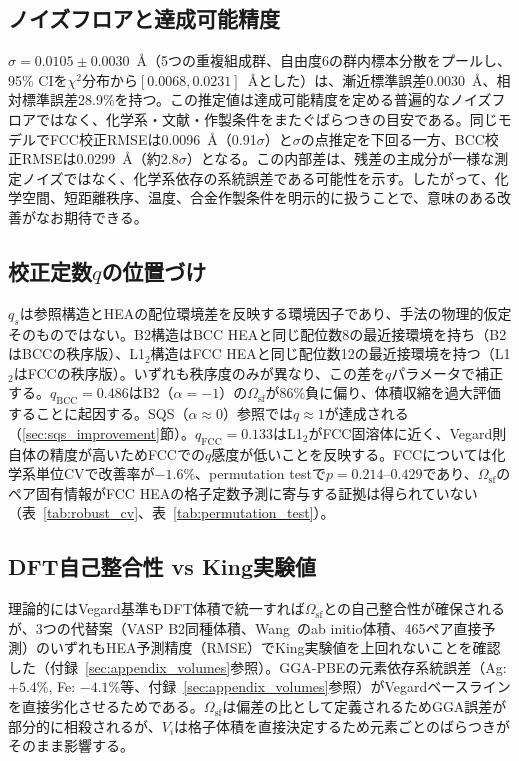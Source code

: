 \documentclass[5p,10pt]{elsarticle}
\begin{document}
\subsection{ノイズフロアと達成可能精度}

$\sigma = 0.0105 \pm 0.0030$~\AA{}（5つの重複組成群、自由度6の群内標本分散をプールし、95\% CIを$\chi^2$分布から$[0.0068, 0.0231]$~\AA{}とした）は、漸近標準誤差0.0030~\AA{}、相対標準誤差28.9\%を持つ。この推定値は達成可能精度を定める普遍的なノイズフロアではなく、化学系・文献・作製条件をまたぐばらつきの目安である。同じモデルでFCC校正RMSEは0.0096~\AA{}（0.91$\sigma$）と$\sigma$の点推定を下回る一方、BCC校正RMSEは0.0299~\AA{}（約$2.8\sigma$）となる。この内部差は、残差の主成分が一様な測定ノイズではなく、化学系依存の系統誤差である可能性を示す。したがって、化学空間、短距離秩序、温度、合金作製条件を明示的に扱うことで、意味のある改善がなお期待できる。


\subsection{校正定数$q$の位置づけ}
\label{sec:q_position}

$q_s$は参照構造とHEAの配位環境差を反映する環境因子であり、手法の物理的仮定そのものではない。B2構造はBCC HEAと同じ配位数8の最近接環境を持ち（B2はBCCの秩序版）、L1$_2$構造はFCC HEAと同じ配位数12の最近接環境を持つ（L1$_2$はFCCの秩序版）。いずれも秩序度のみが異なり、この差を$q$パラメータで補正する。$q_\text{BCC} = 0.486$はB2（$\alpha = -1$）の$\Omega_\text{sf}$が86\%負に偏り、体積収縮を過大評価することに起因する。SQS（$\alpha \approx 0$）参照では$q \approx 1$が達成される（\ref{sec:sqs_improvement}節）。$q_\text{FCC} = 0.133$はL1$_2$がFCC固溶体に近く、Vegard則自体の精度が高いためFCCでの$q$感度が低いことを反映する。FCCについては化学系単位CVで改善率が$-1.6\%$、permutation testで$p = 0.214$--$0.429$であり、$\Omega_\text{sf}$のペア固有情報がFCC HEAの格子定数予測に寄与する証拠は得られていない（表~\ref{tab:robust_cv}、表~\ref{tab:permutation_test}）。


\subsection{DFT自己整合性 vs King実験値}
\label{sec:self_consistency}

理論的にはVegard基準もDFT体積で統一すれば$\Omega_\text{sf}$との自己整合性が確保されるが、3つの代替案（VASP B2同種体積、Wang~\cite{Wang2004lattice}のab initio体積、465ペア直接予測）のいずれもHEA予測精度（RMSE）でKing実験値を上回れないことを確認した（付録~\ref{sec:appendix_volumes}参照）。GGA-PBEの元素依存系統誤差（Ag: $+5.4$\%, Fe: $-4.1$\%等、付録~\ref{sec:appendix_volumes}参照）がVegardベースラインを直接劣化させるためである。$\Omega_\text{sf}$は偏差の比として定義されるためGGA誤差が部分的に相殺されるが、$V_i$は格子体積を直接決定するため元素ごとのばらつきがそのまま影響する。
\end{document}
